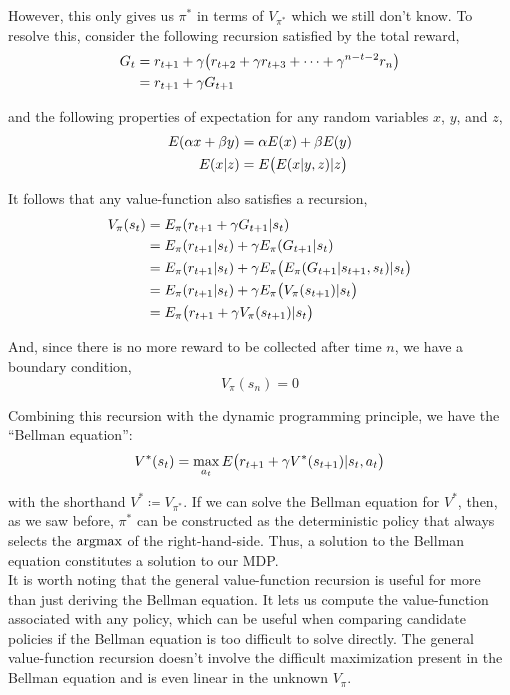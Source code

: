 However, this only gives us $\pi^*$ in terms of $V_{\pi^*}$ which we still don't know. To resolve this, consider the following recursion satisfied by the total reward,
\begin{align*}
G_t &= r_{t+1} + \gamma \big{(}r_{t+2} + \gamma r_{t+3} + \cdots + \gamma^{n-t-2} r_n\big{)}\\
&= r_{t+1} + \gamma G_{t+1}
\end{align*}

and the following properties of expectation for any random variables $x$, $y$, and $z$,
\begin{align*}
E(\alpha x + \beta y) &= \alpha E(x) + \beta E(y)\\
E(x | z) &= E\big{(}E(x | y, z) | z\big{)}
\end{align*}

It follows that any value-function also satisfies a recursion,
\begin{align*}
V_\pi(s_t) &= E_\pi(r_{t+1} + \gamma G_{t+1} | s_t)\\
&= E_\pi(r_{t+1}|s_t) + \gamma E_\pi(G_{t+1} | s_t)\\
&= E_\pi(r_{t+1}|s_t) + \gamma E_\pi\big{(}E_\pi(G_{t+1}|s_{t+1},s_t) | s_t\big{)}\\
&= E_\pi(r_{t+1}|s_t) + \gamma E_\pi\big{(}V_{\pi}(s_{t+1}) | s_t\big{)}\\
&= E_\pi\big{(}r_{t+1} + \gamma V_{\pi}(s_{t+1}) | s_t\big{)}
\end{align*}

And, since there is no more reward to be collected after time $n$, we have a boundary condition,
\begin{equation*}
V_{\pi}(s_n) = 0
\end{equation*}

Combining this recursion with the dynamic programming principle, we have the ``Bellman equation'':
\begin{equation*}
V^*(s_t) = \max_{a_t} E\big{(}r_{t+1} + \gamma V^*(s_{t+1}) | s_t, a_t\big{)}
\end{equation*}

with the shorthand $V^* \coloneqq V_{\pi^*}$. If we can solve the Bellman equation for $V^*$, then, as we saw before, $\pi^*$ can be constructed as the deterministic policy that always selects the $\operatorname*{argmax}$ of the right-hand-side. Thus, a solution to the Bellman equation constitutes a solution to our MDP.\\

It is worth noting that the general value-function recursion is useful for more than just deriving the Bellman equation. It lets us compute the value-function associated with any policy, which can be useful when comparing candidate policies if the Bellman equation is too difficult to solve directly. The general value-function recursion doesn't involve the difficult maximization present in the Bellman equation and is even linear in the unknown $V_\pi$.\\

